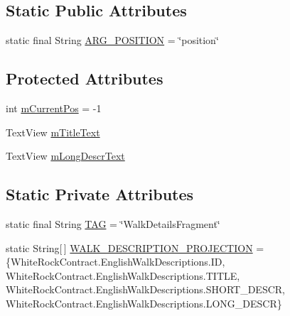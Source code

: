 \subsection*{Static Public Attributes}
\begin{DoxyCompactItemize}
\item 
static final String \hyperlink{classuk_1_1ac_1_1swan_1_1digitaltrails_1_1fragments_1_1_walk_details_fragment_a02d99d54cee133857e5cfa141b6e778f}{A\+R\+G\+\_\+\+P\+O\+S\+I\+T\+I\+O\+N} = \char`\"{}position\char`\"{}
\end{DoxyCompactItemize}
\subsection*{Protected Attributes}
\begin{DoxyCompactItemize}
\item 
int \hyperlink{classuk_1_1ac_1_1swan_1_1digitaltrails_1_1fragments_1_1_walk_details_fragment_ab621239845b9a219b0c977a988c3a931}{m\+Current\+Pos} = -\/1
\item 
Text\+View \hyperlink{classuk_1_1ac_1_1swan_1_1digitaltrails_1_1fragments_1_1_walk_details_fragment_a9413fe91d82c12dd82f7d09040e6363e}{m\+Title\+Text}
\item 
Text\+View \hyperlink{classuk_1_1ac_1_1swan_1_1digitaltrails_1_1fragments_1_1_walk_details_fragment_ad3a7b2a803acadbc7fdaee19e0d72c81}{m\+Long\+Descr\+Text}
\end{DoxyCompactItemize}
\subsection*{Static Private Attributes}
\begin{DoxyCompactItemize}
\item 
static final String \hyperlink{classuk_1_1ac_1_1swan_1_1digitaltrails_1_1fragments_1_1_walk_details_fragment_a2c0b3b3d66868ccd12261377290ee23a}{T\+A\+G} = \char`\"{}Walk\+Details\+Fragment\char`\"{}
\item 
static String\mbox{[}$\,$\mbox{]} \hyperlink{classuk_1_1ac_1_1swan_1_1digitaltrails_1_1fragments_1_1_walk_details_fragment_a95052e4513eede3fa8e41f768827d911}{W\+A\+L\+K\+\_\+\+D\+E\+S\+C\+R\+I\+P\+T\+I\+O\+N\+\_\+\+P\+R\+O\+J\+E\+C\+T\+I\+O\+N} = \{White\+Rock\+Contract.\+English\+Walk\+Descriptions.\+I\+D, White\+Rock\+Contract.\+English\+Walk\+Descriptions.\+T\+I\+T\+L\+E, White\+Rock\+Contract.\+English\+Walk\+Descriptions.\+S\+H\+O\+R\+T\+\_\+\+D\+E\+S\+C\+R, White\+Rock\+Contract.\+English\+Walk\+Descriptions.\+L\+O\+N\+G\+\_\+\+D\+E\+S\+C\+R\}
\end{DoxyCompactItemize}



